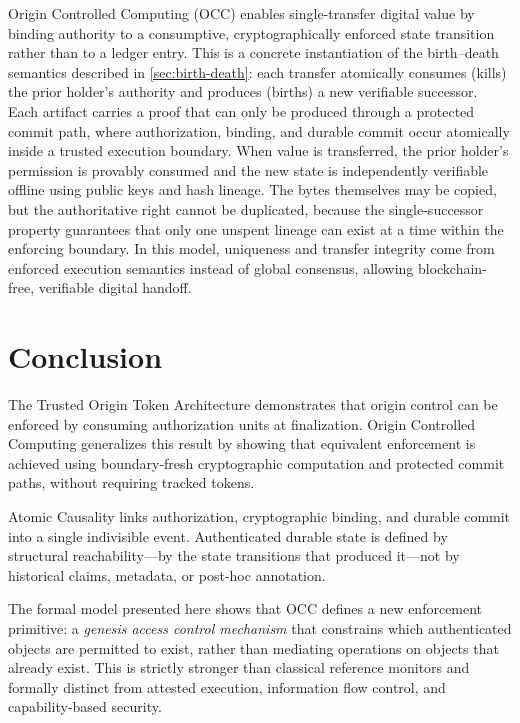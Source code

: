 \documentclass[11pt,letterpaper]{article}
\theoremstyle{occplain}
\theoremstyle{occremark}
\begin{document}
Origin Controlled Computing (OCC) enables single-transfer digital value by binding authority to a consumptive, cryptographically enforced state transition rather than to a ledger entry. This is a concrete instantiation of the birth--death semantics described in \cref{sec:birth-death}: each transfer atomically consumes (kills) the prior holder's authority and produces (births) a new verifiable successor. Each artifact carries a proof that can only be produced through a protected commit path, where authorization, binding, and durable commit occur atomically inside a trusted execution boundary. When value is transferred, the prior holder's permission is provably consumed and the new state is independently verifiable offline using public keys and hash lineage. The bytes themselves may be copied, but the authoritative right cannot be duplicated, because the single-successor property guarantees that only one unspent lineage can exist at a time within the enforcing boundary. In this model, uniqueness and transfer integrity come from enforced execution semantics instead of global consensus, allowing blockchain-free, verifiable digital handoff.


\section{Conclusion}
\label{sec:conclusion}

The Trusted Origin Token Architecture demonstrates that origin control can be enforced by consuming authorization units at finalization. Origin Controlled Computing generalizes this result by showing that equivalent enforcement is achieved using boundary-fresh cryptographic computation and protected commit paths, without requiring tracked tokens.

Atomic Causality links authorization, cryptographic binding, and durable commit into a single indivisible event. Authenticated durable state is defined by structural reachability---by the state transitions that produced it---not by historical claims, metadata, or post-hoc annotation.

The formal model presented here shows that OCC defines a new enforcement primitive: a \emph{genesis access control mechanism} that constrains which authenticated objects are permitted to exist, rather than mediating operations on objects that already exist. This is strictly stronger than classical reference monitors and formally distinct from attested execution, information flow control, and capability-based security.
\end{document}
